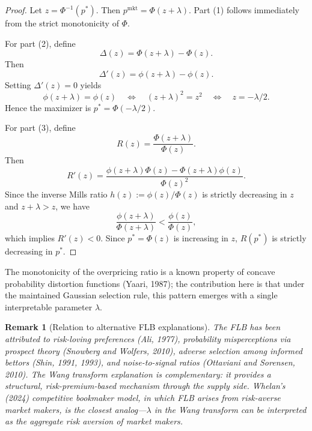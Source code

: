 \documentclass[12pt,a4paper]{article}
\newtheorem{remark}{Remark}
\begin{document}
\begin{proof}
Let $z=\Phi^{-1}(p^*)$. Then $p^{\mathrm{mkt}}=\Phi(z+\lambda)$.
Part (1) follows immediately from the strict monotonicity of $\Phi$.

For part (2), define
\[
\Delta(z)=\Phi(z+\lambda)-\Phi(z).
\]
Then
\[
\Delta'(z)=\phi(z+\lambda)-\phi(z).
\]
Setting $\Delta'(z)=0$ yields
\[
\phi(z+\lambda)=\phi(z)
\quad\Longleftrightarrow\quad
(z+\lambda)^2=z^2
\quad\Longleftrightarrow\quad
z=-\lambda/2.
\]
Hence the maximizer is $p^*=\Phi(-\lambda/2)$.

For part (3), define
\[
R(z)=\frac{\Phi(z+\lambda)}{\Phi(z)}.
\]
Then
\[
R'(z)
=
\frac{\phi(z+\lambda)\Phi(z)-\Phi(z+\lambda)\phi(z)}{\Phi(z)^2}.
\]
Since the inverse Mills ratio $h(z):=\phi(z)/\Phi(z)$ is strictly decreasing in $z$ and $z+\lambda>z$, we have
\[
\frac{\phi(z+\lambda)}{\Phi(z+\lambda)}<\frac{\phi(z)}{\Phi(z)},
\]
which implies $R'(z)<0$. Since $p^*=\Phi(z)$ is increasing in $z$, $R(p^*)$ is strictly decreasing in $p^*$.
\end{proof}

The monotonicity of the overpricing ratio is a known property
of concave probability distortion functions (Yaari, 1987); the
contribution here is that under the maintained Gaussian selection rule,
this pattern emerges with a single interpretable parameter $\lambda$.

\begin{remark}[Relation to alternative FLB explanations]
The FLB has been attributed to risk-loving preferences (Ali, 1977), probability misperceptions via prospect theory (Snowberg and Wolfers, 2010), adverse selection among informed bettors (Shin, 1991, 1993), and noise-to-signal ratios (Ottaviani and Sorensen, 2010). The Wang transform explanation is complementary: it provides a structural, risk-premium-based mechanism through the supply side. Whelan's (2024) competitive bookmaker model, in which FLB arises from risk-averse market makers, is the closest analog---$\lambda$ in the Wang transform can be interpreted as the aggregate risk aversion of market makers.
\end{remark}
\end{document}
